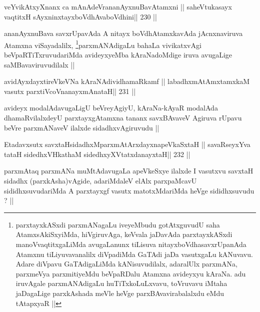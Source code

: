 \begin{shl}
veYvikAtxyXnanx ca mAnAdeVrananAyxnuBavAtamxni ||
saheVtukasayx vaqtitxH sAyxninxtayxboVdhAvaboVdhini\hfill || 230 ||
\end{shl}

\begin{artha}
ananAyxnuBava savxrUpavAda A nitayx boVdhAtamxkavAda jAcnxnaviruva
Atamxna viSayadalilx, \footnote[2]{parxtayxkASxdi parxmANagaLu
  iveyeMbudu gotAtxguvudU saha AtamxsAkiSxyiMda, hiVgiruvAga, keVvala
jaDavAda parxtayxkASxdi manoVvaqtitxgaLiMda avugaLanunx tiLisuva
nitayxboVdhasavxrUpanAda Atamxnu tiLiyuvavanalilx diVpadiMda GaTAdi
jaDa vasutxgaLu kANuvavu. Adare diVpavu GaTAdigaLiMda kANisuvudilalx,
adaralUlx parxmANa, parxmeVya parxmitiyeMdu beVpaRDalu Atamxna
avideyxyu kAraNa. adu iruvAgale parxmANAdigaLu huTiTxkoLuLxvavu,
toVruvavu iMtaha jaDagaLige parxkAshada meVle heVge 
parxBAvavirabalalxdu eMdu tAtapxyaR ||}parxmANAdigaLu bahaLa vivikatxvAgi
beVpaRTiTxruvudariMda avideyxyeMba kAraNadoMdige iruva avugaLige
saMBavaviruvudilalx ||
\end{artha}


\begin{shl}
avidAyxdayxtireVkeVNa kAraNAdividhamaRkamf ||
labadhxmAtAmxtamxkaM vasutx parxtiVcoV\s nanayxmAnataH\hfill || 231 ||
\end{shl}

\begin{artha}
avideyx modalAdavugaLigU beVreyAgiyU, kAraNa-kAyaR modalAda
dhamaRvilalxdeyU parxtayxgAtamxna tananx savxBAvaveV Agiruva rUpavu
beVre parxmANaveV ilalxde sidadhxvAgiruvudu ||
\end{artha}

\begin{shl}
Etadavxsutx savxtaHsidadhxM\footnotemark[1] parxmAtArxdayxnapeVkaSxtaH ||
savaRseyxYva tataH sidedhxVH\footnotemark[1] kathaM sidedhxyXVtatxdanayxtaH\hfill || 232 ||
\end{shl}

\begin{artha}
parxmAtaq parxmANa muMtAdavugaLa apeVkeSxye ilalxde I vasutxvu savxtaH
sidadhx (parxkAsha)vAgide, adariMdaleV elAlx parxpaMcavU
sididhxsuvudariMda A parxtayxgf vasutx matotxMdariMda heVge
sididhxsuvudu ? ||
\end{artha}

